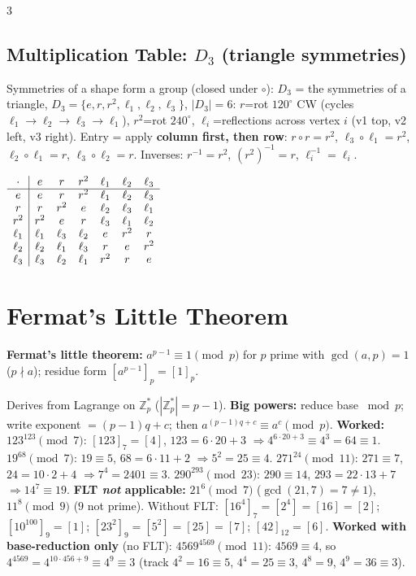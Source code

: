 \documentclass[9pt]{extarticle}
\newcommand{\hl}[1]{\textbf{\textcolor{BrickRed}{#1}}}
\begin{document}
\begin{multicols}{3}
\subsection{Multiplication Table: $D_3$ (triangle symmetries)}
Symmetries of a shape form a group (closed under $\circ$): $D_3$ = the symmetries of a triangle, $D_3=\{e,r,r^2,\ell_1,\ell_2,\ell_3\}$, $|D_3|=6$: $r$=rot $120^\circ$ CW (cycles $\ell_1{\to}\ell_2{\to}\ell_3{\to}\ell_1$), $r^2$=rot $240^\circ$, $\ell_i$=reflections across vertex $i$ (v1 top, v2 left, v3 right). Entry = apply \hl{column first, then row}: $r\circ r=r^2$, $\ell_3\circ\ell_1=r^2$, $\ell_2\circ\ell_1=r$, $\ell_3\circ\ell_2=r$. Inverses: $r^{-1}=r^2$, $(r^2)^{-1}=r$, $\ell_i^{-1}=\ell_i$.
\begin{center}\scriptsize
${\renewcommand{\arraystretch}{0.9}\begin{array}{c|cccccc}\cdot&e&r&r^2&\ell_1&\ell_2&\ell_3\\\hline
e&e&r&r^2&\ell_1&\ell_2&\ell_3\\
r&r&r^2&e&\ell_2&\ell_3&\ell_1\\
r^2&r^2&e&r&\ell_3&\ell_1&\ell_2\\
\ell_1&\ell_1&\ell_3&\ell_2&e&r^2&r\\
\ell_2&\ell_2&\ell_1&\ell_3&r&e&r^2\\
\ell_3&\ell_3&\ell_2&\ell_1&r^2&r&e\end{array}}$
\end{center}

\section{Fermat's Little Theorem}
\begin{kbox}
\textbf{Fermat's little theorem:} \hl{$a^{p-1}\equiv1\pmod p$} for $p$ prime with \hl{$\gcd(a,p)=1$} ($p\nmid a$); residue form $[a^{p-1}]_p=[1]_p$.
\end{kbox}
Derives from Lagrange on $\mathbb Z_p^*$ ($|\mathbb Z_p^*|=p-1$).
\hl{Big powers:} reduce base $\bmod p$; write exponent $=(p-1)q+c$; then $a^{(p-1)q+c}\equiv a^c\pmod p$.
\textbf{Worked:} $123^{123}\pmod7$: $[123]_7=[4]$, $123=6\cdot20+3$ $\Rightarrow 4^{6\cdot20+3}\equiv4^3=64\equiv1$. $19^{68}\pmod7$: $19\equiv5$, $68=6\cdot11+2$ $\Rightarrow5^2=25\equiv4$. $271^{24}\pmod{11}$: $271\equiv7$, $24=10\cdot2+4$ $\Rightarrow7^4=2401\equiv3$. $290^{293}\pmod{23}$: $290\equiv14$, $293=22\cdot13+7$ $\Rightarrow14^7\equiv19$.
\hl{FLT \emph{not} applicable:} $21^6\pmod7$ ($\gcd(21,7)=7\ne1$), $11^8\pmod9$ ($9$ not prime). Without FLT: $[16^4]_7=[2^4]=[16]=[2]$; $[10^{100}]_9=[1]$; $[23^2]_9=[5^2]=[25]=[7]$; $[42]_{12}=[6]$.
\textbf{Worked with base-reduction only} (no FLT): $4569^{4569}\pmod{11}$: $4569\equiv4$, so $4^{4569}=4^{10\cdot456+9}\equiv4^9\equiv3$ (track $4^2{=}16{\equiv}5$, $4^4{=}25{\equiv}3$, $4^8{=}9$, $4^9{=}36{\equiv}3$).


\end{multicols}
\end{document}
